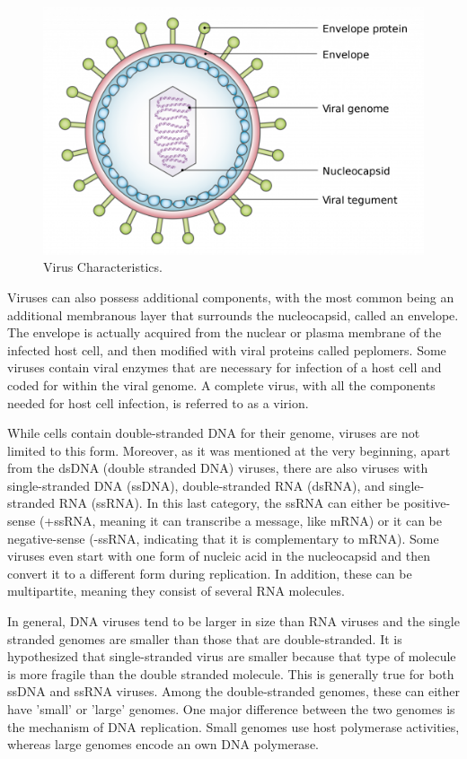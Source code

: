 \begin{figure}[!ht]
	\centering
	\includegraphics[width=.75\textwidth]{figures/virus.png}
	\caption{Virus Characteristics. \label{o:latex_friendly_zone}}
\end{figure}

Viruses can also possess additional components, with the most common being an additional membranous layer that surrounds the nucleocapsid, called an envelope. 
The envelope is actually acquired from the nuclear or plasma membrane of the infected host cell, and then modified with viral proteins called peplomers. 
Some viruses contain viral enzymes that are necessary for infection of a host cell and coded for within the viral genome. 
A complete virus, with all the components needed for host cell infection, is referred to as a virion.

While cells contain double-stranded DNA for their genome, viruses are not limited to this form. 
Moreover, as it was mentioned at the very beginning, apart from the dsDNA (double stranded DNA) viruses, there are also viruses with single-stranded DNA (ssDNA), double-stranded RNA (dsRNA), and single-stranded RNA (ssRNA). 
In this last category, the ssRNA can either be positive-sense (+ssRNA, meaning it can transcribe a message, like mRNA) or it can be negative-sense (-ssRNA, indicating that it is complementary to mRNA). Some viruses even start with one form of nucleic acid in the nucleocapsid and then convert it to a different form during replication.
In addition, these can be multipartite, meaning they consist of several RNA molecules.

In general, DNA viruses tend to be larger in size than RNA viruses and the single stranded genomes are smaller than those that are double-stranded. 
It is hypothesized that single-stranded virus are smaller because that type of molecule is more fragile than the double stranded molecule. 
This is generally true for both ssDNA and ssRNA viruses.
Among the double-stranded genomes, these can either have 'small' or 'large' genomes. 
One major difference between the two genomes is the mechanism of DNA replication. 
Small genomes use host polymerase activities, whereas large genomes encode an own DNA polymerase.


